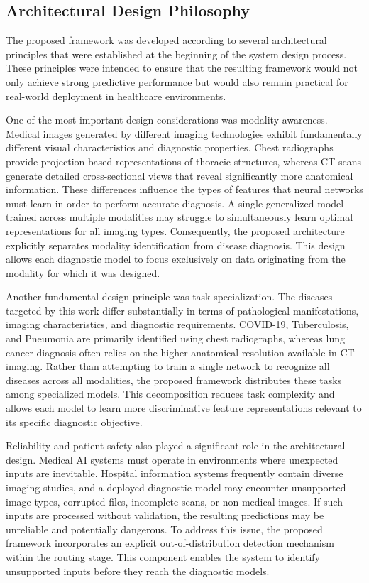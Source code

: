 \subsection{Architectural Design Philosophy}

The proposed framework was developed according to several architectural principles that were established at the beginning of the system design process. These principles were intended to ensure that the resulting framework would not only achieve strong predictive performance but would also remain practical for real-world deployment in healthcare environments.

One of the most important design considerations was modality awareness. Medical images generated by different imaging technologies exhibit fundamentally different visual characteristics and diagnostic properties. Chest radiographs provide projection-based representations of thoracic structures, whereas CT scans generate detailed cross-sectional views that reveal significantly more anatomical information. These differences influence the types of features that neural networks must learn in order to perform accurate diagnosis. A single generalized model trained across multiple modalities may struggle to simultaneously learn optimal representations for all imaging types. Consequently, the proposed architecture explicitly separates modality identification from disease diagnosis. This design allows each diagnostic model to focus exclusively on data originating from the modality for which it was designed.

Another fundamental design principle was task specialization. The diseases targeted by this work differ substantially in terms of pathological manifestations, imaging characteristics, and diagnostic requirements. COVID-19, Tuberculosis, and Pneumonia are primarily identified using chest radiographs, whereas lung cancer diagnosis often relies on the higher anatomical resolution available in CT imaging. Rather than attempting to train a single network to recognize all diseases across all modalities, the proposed framework distributes these tasks among specialized models. This decomposition reduces task complexity and allows each model to learn more discriminative feature representations relevant to its specific diagnostic objective.

Reliability and patient safety also played a significant role in the architectural design. Medical AI systems must operate in environments where unexpected inputs are inevitable. Hospital information systems frequently contain diverse imaging studies, and a deployed diagnostic model may encounter unsupported image types, corrupted files, incomplete scans, or non-medical images. If such inputs are processed without validation, the resulting predictions may be unreliable and potentially dangerous. To address this issue, the proposed framework incorporates an explicit out-of-distribution detection mechanism within the routing stage. This component enables the system to identify unsupported inputs before they reach the diagnostic models.

